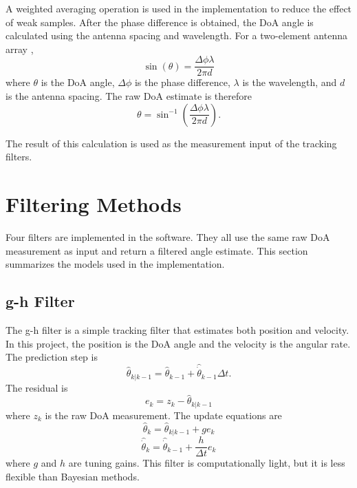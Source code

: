 \documentclass[conference]{IEEEtran}
\begin{document}
A weighted averaging operation is used in the implementation to reduce the effect of weak samples. After the phase difference is obtained, the DoA angle is calculated using the antenna spacing and wavelength. For a two-element antenna array \cite{Zhou2024RealTime},
\begin{equation}
    \sin(\theta) = \frac{\Delta\phi\lambda}{2\pi d}
\end{equation}
where $\theta$ is the DoA angle, $\Delta\phi$ is the phase difference, $\lambda$ is the wavelength, and $d$ is the antenna spacing. The raw DoA estimate is therefore
\begin{equation}
    \theta = \sin^{-1}\left(\frac{\Delta\phi\lambda}{2\pi d}\right).
\end{equation}

The result of this calculation is used as the measurement input of the tracking filters.

\section{Filtering Methods}

Four filters are implemented in the software. They all use the same raw DoA measurement as input and return a filtered angle estimate. This section summarizes the models used in the implementation.

\subsection{g-h Filter}

The g-h filter is a simple tracking filter that estimates both position and velocity. In this project, the position is the DoA angle and the velocity is the angular rate. The prediction step is
\begin{equation}
    \hat{\theta}_{k|k-1} = \hat{\theta}_{k-1} + \hat{\dot{\theta}}_{k-1}\Delta t.
\end{equation}
The residual is
\begin{equation}
    e_k = z_k - \hat{\theta}_{k|k-1}
\end{equation}
where $z_k$ is the raw DoA measurement. The update equations are
\begin{equation}
    \hat{\theta}_k = \hat{\theta}_{k|k-1} + g e_k
\end{equation}
\begin{equation}
    \hat{\dot{\theta}}_k = \hat{\dot{\theta}}_{k-1} + \frac{h}{\Delta t}e_k
\end{equation}
where $g$ and $h$ are tuning gains. This filter is computationally light, but it is less flexible than Bayesian methods.
\end{document}
